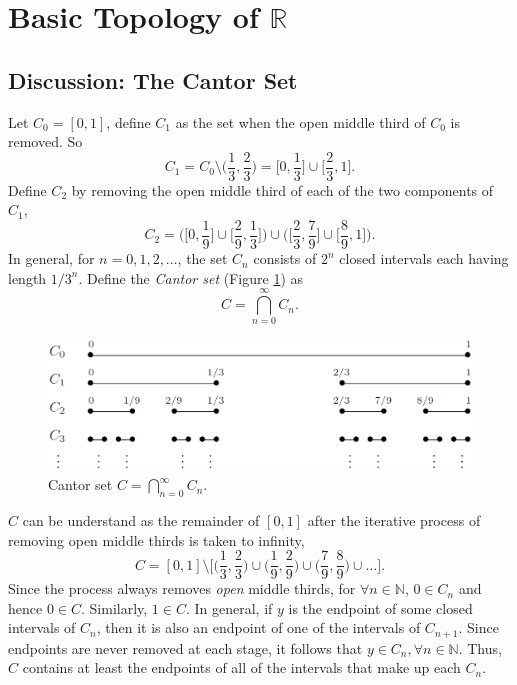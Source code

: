 \documentclass{article}
\begin{document}
            \section{Basic Topology of $\mathbb{R}$}
            \subsection{Discussion: The Cantor Set}
            Let $C_0=[0,1]$, define $C_1$ as the set when the open middle third of $C_0$ is removed. So
            \begin{equation*}
                C_1 = C_0 \setminus \bigg(\frac{1}{3},\frac{2}{3}\bigg) = \bigg[0,\frac{1}{3}\bigg] \cup \bigg[\frac{2}{3},1\bigg].
            \end{equation*}
            Define $C_2$ by removing the open middle third of each of the two components of $C_1$,
            \begin{equation*}
                C_2 = \bigg(\bigg[0,\frac{1}{9}\bigg] \cup \bigg[\frac{2}{9},\frac{1}{3}\bigg]\bigg) \cup \bigg(\bigg[\frac{2}{3},\frac{7}{9}\bigg] \cup \bigg[\frac{8}{9},1\bigg]\bigg).
            \end{equation*}
            In general, for $n=0,1,2,\dots$, the set $C_n$ consists of $2^n$ closed intervals each having length $1/3^n$. Define the \textit{Cantor set} (Figure \ref{cantorset}) as
            \begin{equation*}
                C = \bigcap _{n=0}^\infty C_n .
            \end{equation*}
            \begin{figure}[ht!]
                \centering
                \includegraphics[width=0.9\linewidth]{figs/cantorset.png}
                \caption{Cantor set $C = \bigcap _{n=0}^\infty C_n$.}
                \label{cantorset}
            \end{figure}
            
            $C$ can be understand as the remainder of $[0,1]$ after the iterative process of removing open middle thirds is taken to infinity,
            \begin{equation*}
                C = [0,1] \setminus \bigg[\bigg(\frac{1}{3},\frac{2}{3}\bigg) \cup \bigg(\frac{1}{9},\frac{2}{9}\bigg) \cup \bigg(\frac{7}{9},\frac{8}{9}\bigg) \cup \dots \bigg].
            \end{equation*}
            Since the process always removes \textit{open} middle thirds, for $\forall n \in \mathbb{N}$, $0 \in C_n$ and hence $0 \in C$. Similarly, $1 \in C$. In general, if $y$ is the endpoint of some closed intervals of $C_n$, then it is also an endpoint of one of the intervals of $C_{n+1}$. Since endpoints are never removed at each stage, it follows that $y \in C_n, \forall n \in \mathbb{N}$. Thus, $C$ contains at least the endpoints of all of the intervals that make up each $C_n$.
            
\end{document}
